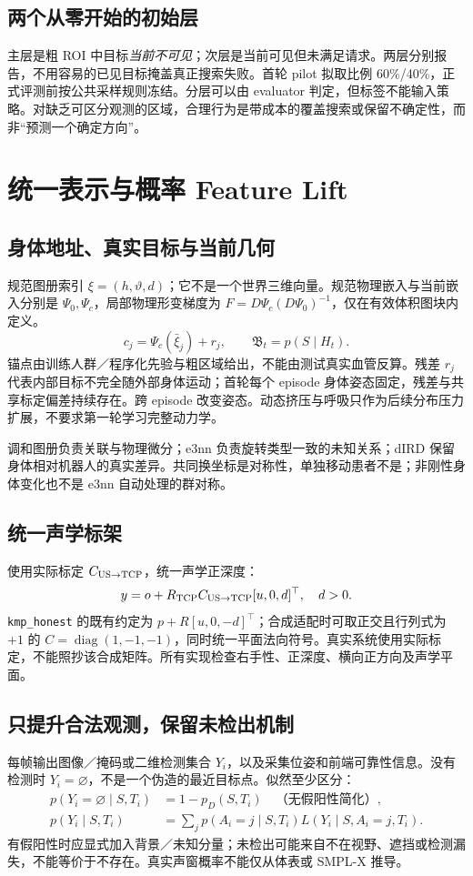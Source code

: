 \documentclass[UTF8,fontset=fandol,11pt,a4paper]{ctexart}
\theoremstyle{plain}
\theoremstyle{definition}
\theoremstyle{remark}
\numberwithin{equation}{section}
\newcommand{\B}{\mathfrak B}
\DeclareMathOperator{\diag}{diag}
\newcommand{\code}[1]{\begingroup\small\nolinkurl{#1}\endgroup}
\begin{document}
\subsection{两个从零开始的初始层}
主层是粗 ROI 中目标\emph{当前不可见}；次层是当前可见但未满足请求。两层分别报告，不用容易的已见目标掩盖真正搜索失败。首轮 pilot 拟取比例 60\%/40\%，正式评测前按公共采样规则冻结。分层可以由 evaluator 判定，但标签不能输入策略。对缺乏可区分观测的区域，合理行为是带成本的覆盖搜索或保留不确定性，而非“预测一个确定方向”。

\section{统一表示与概率 Feature Lift}
\subsection{身体地址、真实目标与当前几何}
规范图册索引 $\xi=(h,\vartheta,d)$；它不是一个世界三维向量。规范物理嵌入与当前嵌入分别是 $\Psi_0,\Psi_c$，局部物理形变梯度为 $F=D\Psi_c(D\Psi_0)^{-1}$，仅在有效体积图块内定义。
\begin{equation}
 c_j=\Psi_c(\bar\xi_j)+r_j,
 \qquad \B_t=p(S\mid H_t).
 \label{eq:state}
\end{equation}
锚点由训练人群／程序化先验与粗区域给出，不能由测试真实血管反算。残差 $r_j$ 代表内部目标不完全随外部身体运动；首轮每个 episode 身体姿态固定，残差与共享标定偏差持续存在。跨 episode 改变姿态。动态挤压与呼吸只作为后续分布压力扩展，不要求第一轮学习完整动力学。

调和图册负责关联与物理微分；e3nn 负责旋转类型一致的未知关系；dIRD 保留身体相对机器人的真实差异。共同换坐标是对称性，单独移动患者不是；非刚性身体变化也不是 e3nn 自动处理的群对称。

\subsection{统一声学标架}
使用实际标定 $C_{\rm US\to TCP}$，统一声学正深度：
\begin{equation}
 y=o+R_{\rm TCP}C_{\rm US\to TCP}[u,0,d]^\top,
 \quad d>0.
 \label{eq:sensorframe}
\end{equation}
\code{kmp_honest} 的既有约定为 $p+R[u,0,-d]^\top$；合成适配时可取正交且行列式为 $+1$ 的 $C=\diag(1,-1,-1)$，同时统一平面法向符号。真实系统使用实际标定，不能照抄该合成矩阵。所有实现检查右手性、正深度、横向正方向及声学平面。

\subsection{只提升合法观测，保留未检出机制}
每帧输出图像／掩码或二维检测集合 $Y_i$，以及采集位姿和前端可靠性信息。没有检测时 $Y_i=\varnothing$，不是一个伪造的最近目标点。似然至少区分：
\begin{align}
 p(Y_i=\varnothing\mid S,T_i)&=1-p_D(S,T_i) \quad\text{（无假阳性简化）},\\
 p(Y_i\mid S,T_i)&=\sum_j p(A_i=j\mid S,T_i)L(Y_i\mid S,A_i=j,T_i).
\end{align}
有假阳性时应显式加入背景／未知分量；未检出可能来自不在视野、遮挡或检测漏失，不能等价于不存在。真实声窗概率不能仅从体表或 SMPL-X 推导。
\end{document}
